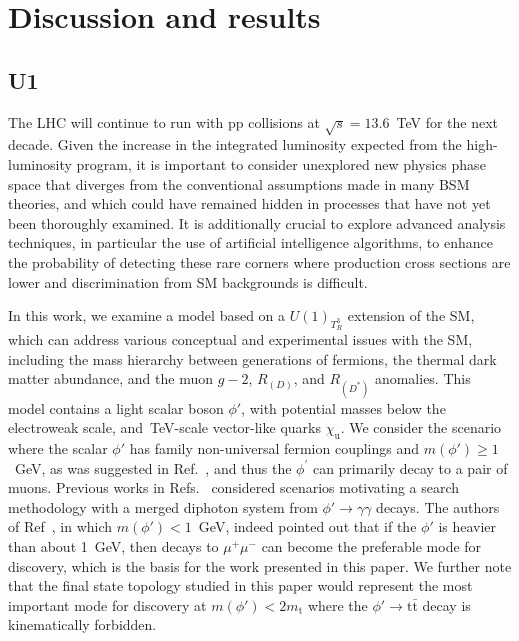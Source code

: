 \chapter{Discussion and results}
\section{U1}

The LHC will continue to run with pp collisions at $\sqrt{s} = 13.6$~\textrm{TeV} for the next decade. Given the increase in the integrated luminosity expected from the high-luminosity program, it is important to consider unexplored new physics phase space that diverges from the conventional assumptions made in many BSM theories, and which could have remained hidden in processes that have not yet been thoroughly examined. It is additionally crucial to explore advanced analysis techniques, in particular the use of artificial intelligence algorithms, to enhance the probability of detecting these rare corners where production cross sections are lower and discrimination from SM backgrounds is difficult. 

In this work, we examine a model based on a $U(1)_{T^3_R}$ extension of the SM, which can address various conceptual and experimental issues with the SM, including the mass hierarchy between generations of fermions, the thermal dark matter abundance, and the muon $g - 2$, $R_{(D)}$, and $R_{(D^*)}$ anomalies. This model contains a light scalar boson $\phi'$, with potential masses below the electroweak scale, and~\textrm{TeV}-scale vector-like quarks $\chi_\mathrm{u}$. We consider the scenario where the scalar $\phi'$ has family non-universal fermion couplings and $m(\phi') \ge 1$~\textrm{GeV}, as was suggested in Ref.~\parencite{Dutta2020}, and thus the $\phi^{\prime}$ can primarily decay to a pair of muons. Previous works in Refs.~\parencite{Dutta2023, Banerjee_2016} considered scenarios motivating a search methodology with a merged diphoton system from $\phi' \to \gamma\gamma$ decays. The authors of Ref~\parencite{Dutta2023}, in which $m(\phi') < 1$~\textrm{GeV},  indeed pointed out that if the $\phi'$ is heavier than about 1~\textrm{GeV}, then decays to $\mu^+ \mu^-$ can become the preferable mode for discovery, which is the basis for the work presented in this paper. We further note that the final state topology studied in this paper would represent the most important mode for discovery at $m(\phi') < 2 m_{\mathrm{t}}$ where the $\phi' \to \mathrm{t\bar{t}}$ decay is kinematically forbidden. 

